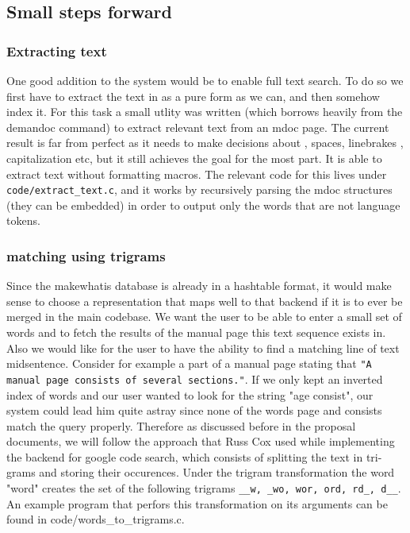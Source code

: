 \documentclass{report}
\begin{document}
\subsection*{Small steps forward}

\subsubsection*{Extracting text}
One good addition to the system would be to enable full text search. To do so we first have to extract the text in as a pure form as we can, and then somehow index it.
For this task a small utlity was written (which borrows heavily from the demandoc command) to extract relevant text from an mdoc page. The current result is far from perfect
as it needs to make decisions about , spaces, linebrakes , capitalization etc, but it still achieves the goal for the most part. It is able to extract text without formatting
macros. The relevant code for this lives under {\tt code/extract\_text.c}, and it works by recursively parsing the mdoc structures (they can be embedded) in order to 
output only the words that are not language tokens. 

\subsubsection*{matching using trigrams}
Since the makewhatis database is already in a hashtable format, it would make sense to choose a representation that maps well to that backend if it is to ever be merged in the
main codebase. We want the user to be able to enter a small set of words and to fetch the results of the manual page this text sequence exists in. Also we would like for
the user to have the ability to find a matching line of text midsentence. Consider for example a part of a manual page stating that {\tt "A manual page consists of several sections."}.
If we only kept an inverted index of words and our user wanted to look for the string "age consist", our system could lead him quite astray since none of the words page and consists match
the query properly. Therefore as discussed before in the proposal documents, we will follow the approach that Russ Cox used while implementing the backend for google code search, which consists
of splitting the text in tri-grams and storing their occurences. Under the trigram transformation the word "word" creates the set of the following trigrams
{\tt \_\_w, \_wo, wor, ord, rd\_, d\_\_}. An example program that perfors this transformation on its arguments can be found in {code/words\_to\_trigrams.c}.
\end{document}
